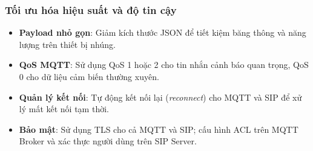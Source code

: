 \subsubsection{Tối ưu hóa hiệu suất và độ tin cậy}
\begin{itemize}
    \item \textbf{Payload nhỏ gọn}: Giảm kích thước JSON để tiết kiệm băng thông và năng lượng trên thiết bị nhúng.
    \item \textbf{QoS MQTT}: Sử dụng QoS 1 hoặc 2 cho tin nhắn cảnh báo quan trọng, QoS 0 cho dữ liệu cảm biến thường xuyên.
    \item \textbf{Quản lý kết nối}: Tự động kết nối lại (\textit{reconnect}) cho MQTT và SIP để xử lý mất kết nối tạm thời.
    \item \textbf{Bảo mật}: Sử dụng TLS cho cả MQTT và SIP; cấu hình ACL trên MQTT Broker và xác thực người dùng trên SIP Server.
\end{itemize}
